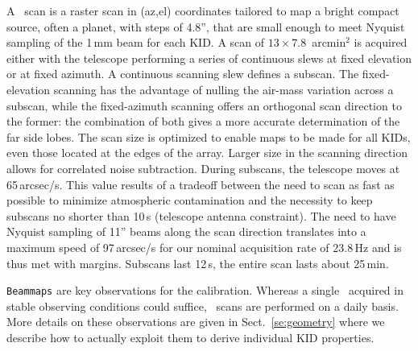 A \bm\ scan is a raster scan in (az,el) coordinates tailored to map a
bright compact source, often a planet, with steps of 4.8'', that are
small enough to meet Nyquist sampling of the 1\,mm beam for each KID. A scan of 
$13\times7.8$~arcmin$^2$ is acquired either with the telescope
performing a series of continuous slews at fixed elevation or at fixed azimuth. 
A continuous scanning slew defines a subscan. 
The fixed-elevation scanning has the advantage of nulling the air-mass variation
across a subscan, while the fixed-azimuth scanning offers an
orthogonal scan direction to the former:
the combination of both gives a more accurate determination of the far side
lobes.
The scan size is optimized to enable maps to be made for all
KIDs, even those located at the edges of the array. Larger size in the scanning
direction allows for correlated noise subtraction.
During subscans, the telescope moves at
65\,arcsec/s. This value results of a tradeoff between the need to scan as
fast as possible to minimize atmospheric contamination and the
necessity to keep subscans no shorter than 10\,s (telescope antenna 
constraint). The need to have Nyquist sampling of 11'' beams along the
scan direction translates into a maximum speed of 97\,arcsec/s
for our nominal acquisition rate of 23.8\,Hz and is thus met with margins. Subscans
last 12\,s, the entire scan lasts about 25\,min.%

{\tt Beammaps} are key observations for the calibration. {\lp Whereas
a single \bm\ acquired in stable observing conditions could suffice,
\bm\ scans are performed on a daily basis.}
More details on these observations are given in Sect.~\ref{se:geometry}
where we describe how to actually exploit them to derive individual KID
properties.

